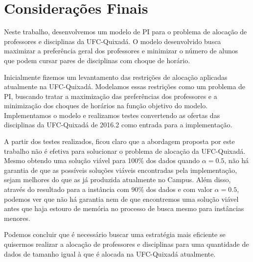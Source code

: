 \chapter{Considerações Finais}
\label{chap:consideracoes}

Neste trabalho, desenvolvemos um modelo de PI para o problema de alocação de professores e disciplinas da UFC-Quixadá. O modelo desenvolvido busca maximizar a preferência geral dos professores e minimizar o número de alunos que podem cursar pares de disciplinas com choque de horário.

Inicialmente fizemos um levantamento das restrições de alocação aplicadas atualmente na UFC-Quixadá. Modelamos essas restrições como um problema de PI, buscando tratar a maximização das preferências dos professores e a minimização dos choques de horários na função objetivo do modelo. Implementamos o modelo e realizamos testes convertendo as ofertas das disciplinas da UFC-Quixadá de 2016.2 como entrada para a implementação.

A partir dos testes realizados, ficou claro que a abordagem proposta por este trabalho não é efetiva para solucionar o problema de alocação da UFC-Quixadá. Mesmo obtendo uma solução viável para 100\% dos dados quando $\alpha = 0.5$, não há garantia de que as possíveis soluções viáveis encontradas pela implementação, sejam melhores do que as já produzida atualmente no Campus. Além disso, através do resultado para a instância com 90\% dos dados e com valor $\alpha = 0.5$, podemos ver que não há garantia nem de que encontremos uma solução viável antes que haja estouro de memória no processo de busca mesmo para instâncias menores.

Podemos concluir que é necessário buscar uma estratégia mais eficiente se quisermos realizar a alocação de professores e disciplinas para uma quantidade de dados de tamanho igual à que é alocada na UFC-Quixadá atualmente. 

